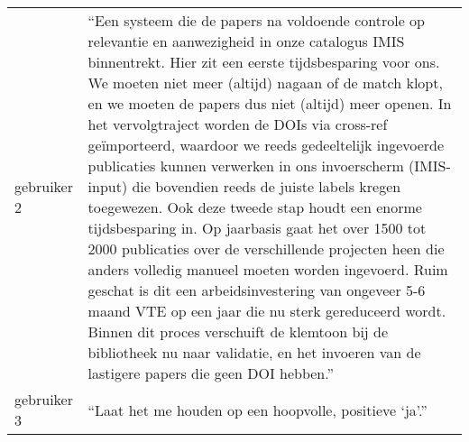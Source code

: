 \begin{table}[h!]
\begin{sideways}
\begin{tabularx}{\textwidth}{|p{2cm}|X|}
        gebruiker 2&\enquote{Een systeem die de papers na voldoende controle op relevantie en aanwezigheid in onze catalogus IMIS binnentrekt. Hier zit een eerste tijdsbesparing voor ons. We moeten niet meer (altijd) nagaan of de match klopt, en we moeten de papers dus niet (altijd) meer openen. In het vervolgtraject worden de DOIs via cross-ref geïmporteerd, waardoor we reeds gedeeltelijk ingevoerde publicaties kunnen verwerken in ons invoerscherm (IMIS-input) die bovendien reeds de juiste labels kregen toegewezen. Ook deze tweede stap houdt een enorme tijdsbesparing in. Op jaarbasis gaat het over 1500 tot 2000 publicaties over de verschillende projecten heen die anders volledig manueel moeten worden ingevoerd. Ruim geschat is dit een arbeidsinvestering van ongeveer 5-6 maand VTE op een jaar die nu sterk gereduceerd wordt. Binnen dit proces verschuift de klemtoon bij de bibliotheek nu naar validatie, en het invoeren van de lastigere papers die geen DOI hebben.}\\
        gebruiker 3&\enquote{Laat het me houden op een hoopvolle, positieve ‘ja’.}\\
        \hline
    \end{tabularx}
    \end{sideways}
    \label{table:gebruikersfeedback}
\end{table}

